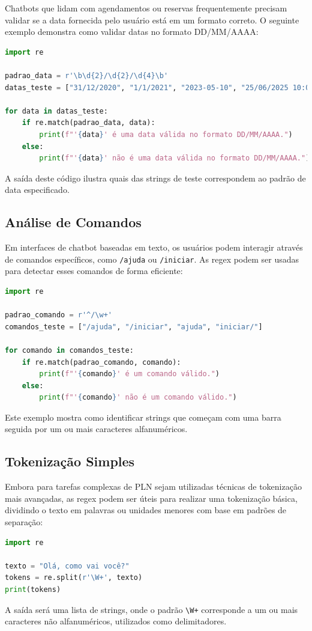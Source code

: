 \documentclass[14pt,a4paper,oneside]{book}
\begin{document}
Chatbots que lidam com agendamentos ou reservas frequentemente precisam validar se a data fornecida pelo usuário está em um formato correto. O seguinte exemplo demonstra como validar datas no formato DD/MM/AAAA:

\begin{lstlisting}[language=Python, caption=Validação de datas com regex, label=lst:validacao_data]
import re

padrao_data = r'\b\d{2}/\d{2}/\d{4}\b'
datas_teste = ["31/12/2020", "1/1/2021", "2023-05-10", "25/06/2025 10:00"]

for data in datas_teste:
    if re.match(padrao_data, data):
        print(f"'{data}' é uma data válida no formato DD/MM/AAAA.")
    else:
        print(f"'{data}' não é uma data válida no formato DD/MM/AAAA.")
\end{lstlisting}
A saída deste código ilustra quais das strings de teste correspondem ao padrão de data especificado.

\subsection{Análise de Comandos}
Em interfaces de chatbot baseadas em texto, os usuários podem interagir através de comandos específicos, como \texttt{/ajuda} ou \texttt{/iniciar}. As regex podem ser usadas para detectar esses comandos de forma eficiente:
\begin{lstlisting}[language=Python, caption=Análise de comandos com regex, label=lst:analise_comando]
import re

padrao_comando = r'^/\w+'
comandos_teste = ["/ajuda", "/iniciar", "ajuda", "iniciar/"]

for comando in comandos_teste:
    if re.match(padrao_comando, comando):
        print(f"'{comando}' é um comando válido.")
    else:
        print(f"'{comando}' não é um comando válido.")
\end{lstlisting}
Este exemplo mostra como identificar strings que começam com uma barra seguida por um ou mais caracteres alfanuméricos.

\subsection{Tokenização Simples}
Embora para tarefas complexas de PLN sejam utilizadas técnicas de tokenização mais avançadas, as regex podem ser úteis para realizar uma tokenização básica, dividindo o texto em palavras ou unidades menores com base em padrões de separação:
\begin{lstlisting}[language=Python, caption=Tokenização simples com regex, label=lst:tokenizacao_simples]
import re

texto = "Olá, como vai você?"
tokens = re.split(r'\W+', texto)
print(tokens)
\end{lstlisting}
A saída será uma lista de strings, onde o padrão \texttt{\textbackslash{}W+} corresponde a um ou mais caracteres não alfanuméricos, utilizados como delimitadores.
\end{document}
